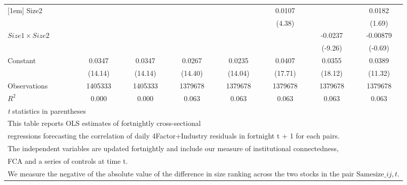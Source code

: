 {\begin{tabular}{l*{7}{c}}
[1em]
Size2               &                     &                     &                     &                     &      0.0107\sym{***}&                     &      0.0182         \\
                    &                     &                     &                     &                     &      (4.38)         &                     &      (1.69)         \\
[1em]
$ Size1 \times Size2 $&                     &                     &                     &                     &                     &     -0.0237\sym{***}&    -0.00879         \\
                    &                     &                     &                     &                     &                     &     (-9.26)         &     (-0.69)         \\
[1em]
Constant            &      0.0347\sym{***}&      0.0347\sym{***}&      0.0267\sym{***}&      0.0235\sym{***}&      0.0407\sym{***}&      0.0355\sym{***}&      0.0389\sym{***}\\
                    &     (14.14)         &     (14.14)         &     (14.40)         &     (14.04)         &     (17.71)         &     (18.12)         &     (11.32)         \\
\hline
Observations        &     1405333         &     1405333         &     1379678         &     1379678         &     1379678         &     1379678         &     1379678         \\
\(R^{2}\)           &       0.000         &       0.000         &       0.063         &       0.063         &       0.063         &       0.063         &       0.063         \\
\hline\hline
\multicolumn{8}{l}{\footnotesize \textit{t} statistics in parentheses}\\
\multicolumn{8}{l}{\footnotesize This table reports OLS estimates of fortnightly cross-sectional}\\
\multicolumn{8}{l}{\footnotesize  regressions forecasting the correlation of daily 4Factor+Industry residuals in fortnight t + 1 for each pairs.}\\
\multicolumn{8}{l}{\footnotesize The independent variables are updated fortnightly and include our measure of institutional connectedness,}\\
\multicolumn{8}{l}{\footnotesize  FCA and a series of controls at time t.}\\
\multicolumn{8}{l}{\footnotesize We measure the negative of the absolute value of the difference in size ranking across the two stocks in the pair $ \text{Samesize}\_{ij,t} $.}\\

\end{tabular}}
